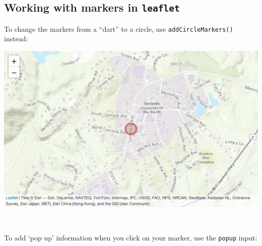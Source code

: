 \documentclass[
]{book}
\newenvironment{Shaded}{\begin{snugshade}}{\end{snugshade}}
\newcommand{\AttributeTok}[1]{\textcolor[rgb]{0.77,0.63,0.00}{#1}}
\newcommand{\DecValTok}[1]{\textcolor[rgb]{0.00,0.00,0.81}{#1}}
\newcommand{\FunctionTok}[1]{\textcolor[rgb]{0.00,0.00,0.00}{#1}}
\newcommand{\NormalTok}[1]{#1}
\newcommand{\SpecialCharTok}[1]{\textcolor[rgb]{0.00,0.00,0.00}{#1}}
\newcommand{\StringTok}[1]{\textcolor[rgb]{0.31,0.60,0.02}{#1}}
\begin{document}
\hypertarget{working-with-markers-in-leaflet}{%
\subsection*{\texorpdfstring{Working with markers in \texttt{leaflet}}{Working with markers in leaflet}}\label{working-with-markers-in-leaflet}}

To change the markers from a ``dart'' to a circle, use \texttt{addCircleMarkers()} instead:

\begin{Shaded}
\end{Shaded}

\includegraphics{figures/unnamed-chunk-217-1.pdf}

~

To add `pop up' information when you click on your marker, use the \texttt{popup} input:
\end{document}
